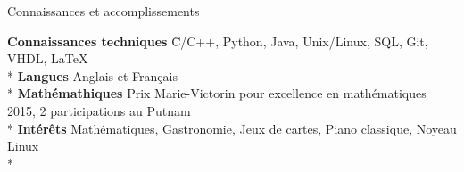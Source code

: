 \documentclass{article}
\newlength{\tabin}
\newlength{\secsep}
\newcommand{\lineunder}{\vspace*{-8pt} \\ \hspace*{-6pt} \hrulefill \\ \vspace*{-15pt}}
\newenvironment{tabbedsection}[1]{
  \begin{list}{}{
      \setlength{\itemsep}{0pt}
      \setlength{\labelsep}{0pt}
      \setlength{\labelwidth}{0pt}
      \setlength{\leftmargin}{\tabin}
      \setlength{\rightmargin}{\tabin}
      \setlength{\listparindent}{0pt}
      \setlength{\parsep}{0pt}
      \setlength{\parskip}{0pt}
      \setlength{\partopsep}{0pt}
      \setlength{\topsep}{#1}
    }
  \item[]
}{\end{list}}
\newenvironment{nospacetabbing}{
    \begin{tabbing}
}{\end{tabbing}\vspace{-1.2em}}
\newenvironment{resume_section}[1]{
  \filbreak
  \vspace{2\secsep}
  \textsc{\large#1}
  \lineunder
  \begin{tabbedsection}{\secsep}
}{\end{tabbedsection}}
\begin{document}
\begin{resume_section}{Connaissances et accomplissements}
  \begin{nospacetabbing}

  \textbf{Connaissances techniques}  \= C/C++, Python, Java, Unix/Linux, SQL, Git, VHDL, \LaTeX\\*
  \textbf{Langues} \> Anglais et Français\\*
  \textbf{Mathémathiques} \> Prix Marie-Victorin pour excellence en mathématiques 2015, 2 participations au Putnam\\*
  \textbf{Intérêts} \> Mathématiques, Gastronomie, Jeux de cartes, Piano classique, Noyeau Linux\\*
  \end{nospacetabbing}
\end{resume_section}
\end{document}
